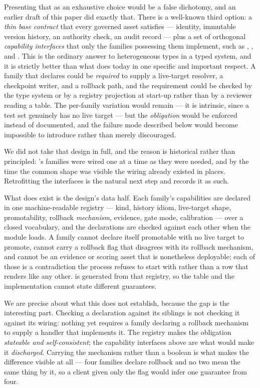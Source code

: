  Presenting that as an exhaustive
choice would be a false dichotomy, and an earlier draft of this paper did exactly
that. There is a well-known third option: a \emph{thin base contract} that every
governed asset satisfies --- identity, immutable version history, an authority
check, an audit record --- plus a set of orthogonal \emph{capability interfaces}
that only the families possessing them implement, such as ,
, and . This is the ordinary answer to
heterogeneous types in a typed system, and it is strictly better than what \sys
does today in one specific and important respect. A family that declares
 could be \emph{required} to supply a live-target resolver, a
checkpoint writer, and a rollback path, and the requirement could be checked by the
type system or by a registry projection at start-up rather than by a reviewer
reading a table. The per-family variation would remain --- it is intrinsic, since a
test set genuinely has no live target --- but the \emph{obligation} would be
enforced instead of documented, and the failure mode described below would become
impossible to introduce rather than merely discouraged.

We did not take that design in full, and the reason is historical rather than
principled: \sys's families were wired one at a time as they were needed, and by
the time the common shape was visible the wiring already existed in
\statFamilies{} places. Retrofitting the interfaces is the natural next step and
 records it as such.

What does exist is the design's data half. Each family's capabilities are declared
in one machine-readable registry --- kind, history idiom, live-target shape,
promotability, rollback \emph{mechanism}, evidence, gate mode, calibration --- over
a closed vocabulary, and the declarations are checked against each other when the
module loads. A family cannot declare itself promotable with no live target to
promote, cannot carry a rollback flag that disagrees with its rollback mechanism,
and cannot be an evidence or scoring asset that is nonetheless deployable; each of
those is a contradiction the process refuses to start with rather than a row that
renders like any other.  is generated from that registry, so
the table and the implementation cannot state different guarantees.

We are precise about what this does not establish, because the gap is the
interesting part. Checking a declaration against its siblings is not checking it
against its wiring: nothing yet requires a family declaring a rollback mechanism to
supply a handler that implements it. The registry makes the obligation
\emph{stateable and self-consistent}; the capability interfaces above are what would
make it \emph{discharged}. Carrying the mechanism rather than a boolean is what
makes the difference visible at all --- four families declare rollback and no two
mean the same thing by it, so a client given only the flag would infer one guarantee
from four.

